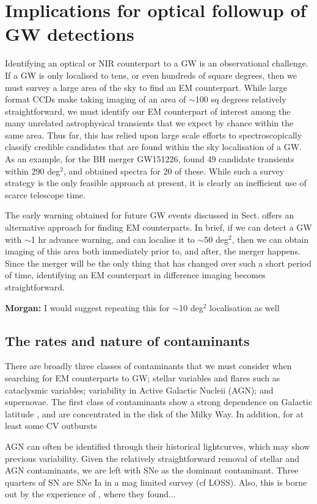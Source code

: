 \documentclass{aa}
\begin{document}
\section{Implications for optical followup of GW detections} \label{sect:EM}
Identifying an optical or NIR counterpart to a GW is an observational challenge. If a GW is only localised to tens, or even hundreds of square degrees, then we must survey a large area of the sky to find an EM counterpart. While large format CCDs make taking imaging of an area of $\sim$100 sq degrees relatively straightforward, we must identify our EM counterpart of interest among the many unrelated astrophysical transients that we expect by chance within the same area. Thus far, this has relied upon large scale efforts to spectroscopically classify credible candidates that are found within the sky localisation of a GW. As an example, for the BH merger GW151226, \cite{Smar16} found 49 candidate transients within 290 deg$^2$, and obtained spectra for 20 of these. While such a survey strategy is the only feasible approach at present, it is clearly an inefficient use of scarce telescope time.

The early warning obtained for future GW events discussed in Sect. \label{sect:et} offers an alternative approach for finding EM counterparts. In brief, if we can detect a GW with $\sim$1 hr advance warning, and can localise it to $\sim$50 deg$^2$, then we can obtain imaging of this area both immediately prior to, and after, the merger happens. Since the merger will be the only thing that has changed over such a short period of time, identifying an EM counterpart in difference imaging becomes straightforward.

{\bf Morgan:} I would suggest repeating this for $\sim$10 deg$^2$ localisation as well

\subsection{The rates and nature of contaminants}

There are broadly three classes of contaminants that we must consider when searching for EM counterparts to GW; stellar variables and flares such as cataclysmic variables; variability in Active Galactic Nucleii (AGN); and supernovae. The first class of contaminants show a strong dependence on Galactic latitude \citep{Drak14}, and are concentrated in the disk of the Milky Way. In addition, for at least some CV outbursts 

AGN can often be identified through their historical lightcurves, which may show previous variability. Given the relatively straightforward removal of stellar and AGN contaminants, we are left with SNe as the dominant contaminant. Three quarters of SN are SNe Ia in a mag limited survey (cf LOSS). Also, this is borne out by the experience of \cite{Smar16}, where they found...
\end{document}
